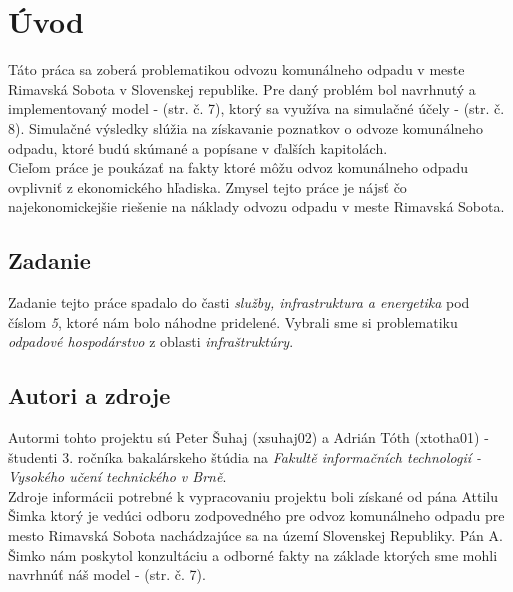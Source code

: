 \documentclass[11pt,a4paper]{article}
\begin{document}

\setlength{\parskip}{0pt}
\hypersetup{hidelinks}\tableofcontents
\setlength{\parskip}{0pt}

\newpage %

\section{Úvod}

    \indent Táto práca sa zoberá problematikou odvozu komunálneho odpadu v meste Rimavská Sobota v Slovenskej republike. Pre daný problém bol navrhnutý a implementovaný model - \cite{IMS}(str. č. 7), ktorý sa využíva na simulačné účely - \cite{IMS}(str. č. 8). Simulačné výsledky slúžia na získavanie poznatkov o odvoze komunálneho odpadu, ktoré budú skúmané a popísane v ďalších kapitolách.\\[0.4em]
    \indent Cieľom práce je poukázať na fakty ktoré môžu odvoz komunálneho odpadu ovplivniť z ekonomického hľadiska. Zmysel tejto práce je nájsť čo najekonomickejšie riešenie na náklady odvozu odpadu v meste Rimavská Sobota.

    \subsection{Zadanie}

        \indent Zadanie tejto práce spadalo do časti \textit{služby, infrastruktura a energetika}\cite{IMS-TEMA} pod číslom \textit{5}, ktoré nám bolo náhodne pridelené. Vybrali sme si problematiku \textit{odpadové hospodárstvo} z oblasti \textit{infraštruktúry}.

    \subsection{Autori a zdroje}

        \indent Autormi tohto projektu sú Peter Šuhaj (xsuhaj02) a Adrián Tóth (xtotha01) - študenti 3. ročníka bakalárskeho štúdia na \textit{Fakultě informačních technologií - Vysokého učení technického v Brně}\cite{VUT-FIT}.\\[0.4em]
        \indent Zdroje informácii potrebné k vypracovaniu projektu boli získané od pána Attilu Šimka ktorý je vedúci odboru zodpovedného pre odvoz komunálneho odpadu pre mesto Rimavská Sobota nachádzajúce sa na území Slovenskej Republiky. Pán A. Šimko nám poskytol konzultáciu a odborné fakty na základe ktorých sme mohli navrhnúť náš model - \cite{IMS}(str. č. 7).
\end{document}

